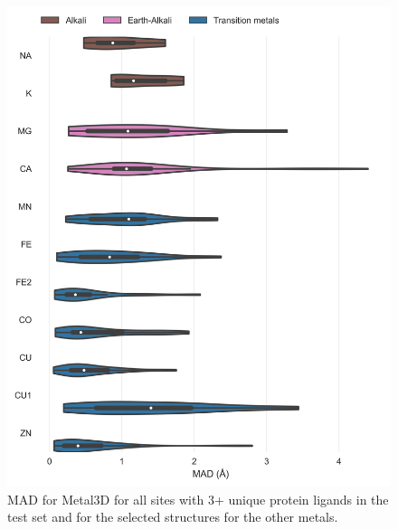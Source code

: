 \documentclass[  ASAPversion,
  ,
  9pt]{elife}
\newenvironment{fignos:tagged-figure}[1][]{
  \let\oldthefigure\thefigure
  \let\oldtheHfigure\theHfigure
  \renewcommand{\thefigure}{#1}
  \renewcommand{\theHfigure}{#1}
}{
  \let\thefigure\oldthefigure
  \let\theHfigure\oldtheHfigure
  \addtocounter{figure}{-1}
}
\begin{document}
\begin{fignos:tagged-figure}[S5]

\begin{figure}
\hypertarget{fig:selectivity-distance-metal3d}{%
\centering
\includegraphics{images/model_0.5metal3D_distances_violin_0.5.jpg}
\caption{MAD for Metal3D for all sites with 3+ unique protein ligands in the test set and for the selected structures for the other metals.}\label{fig:selectivity-distance-metal3d}
}
\end{figure}

\end{fignos:tagged-figure}
\end{document}
